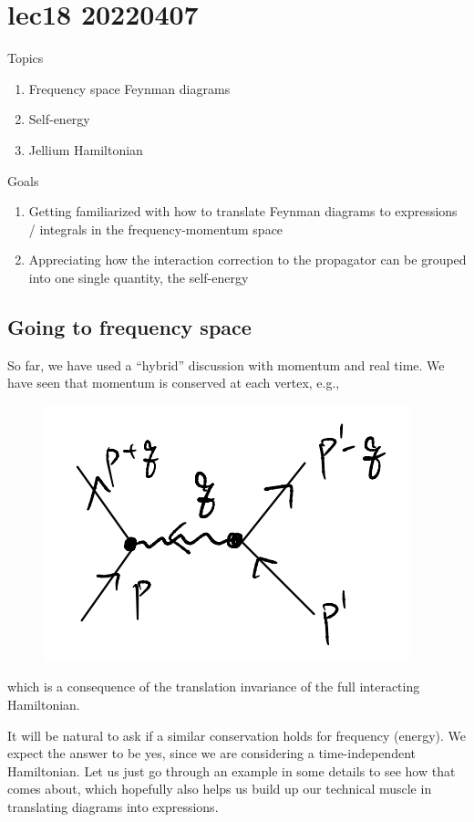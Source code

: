 \chapter{lec18 20220407}

Topics

\begin{enumerate}
    \item Frequency space Feynman diagrams
    \item Self-energy
    \item Jellium Hamiltonian
\end{enumerate}

Goals

\begin{enumerate}
    \item Getting familiarized with how to translate Feynman diagrams to expressions / integrals in the frequency-momentum space
    \item Appreciating how the interaction correction to the propagator can be grouped into one single quantity, the self-energy
\end{enumerate}

\section{Going to frequency space}

So far, we have used a ``hybrid'' discussion with momentum and real time. We have seen that momentum is conserved at each vertex, e.g.,
\begin{figure}[H]
    \centering
    \includegraphics{jupyterbook/data/fig/lec18-fig00.png}
\end{figure}
which is a consequence of the translation invariance of the full interacting Hamiltonian.

It will be natural to ask if a similar conservation holds for frequency (energy). We expect the answer to be yes, since we are considering a time-independent Hamiltonian. Let us just go through an example in some details to see how that comes about, which hopefully also helps us build up our technical muscle in translating diagrams into expressions.

